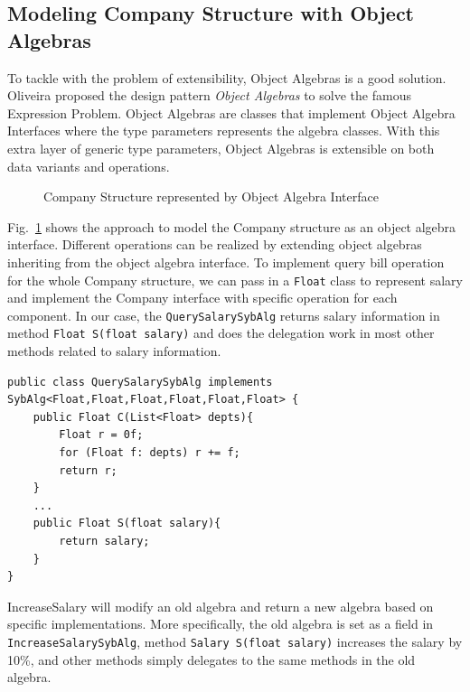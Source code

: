 


\subsection{Modeling Company Structure with Object Algebras}

To tackle with the problem of extensibility, Object Algebras is a good solution.  Oliveira proposed the design pattern \emph{Object Algebras}\cite{bruno12oa} to solve the famous Expression Problem. Object Algebras are classes that implement Object Algebra Interfaces where the type parameters represents the algebra classes. With this extra layer of generic type parameters, Object Algebras is extensible on both data variants and operations.  

\begin{figure}[tb]
\vspace{-.1in}
\caption{Company Structure represented by Object Algebra Interface}
\label{syb_tree}
\end{figure}

Fig.~\ref{syb_tree} shows the approach to model the Company
structure as an object algebra interface. Different operations can be realized by extending object algebras inheriting from the object algebra interface. To implement query bill
operation for the whole Company structure, we can pass in a \lstinline{Float} class to represent salary and implement the
Company interface with specific operation for each component. In our case, the \lstinline{QuerySalarySybAlg} returns salary information in method \lstinline{Float S(float salary)} and does the delegation work in most other methods related to salary information.

\begin{lstlisting}[numbers=none] 
public class QuerySalarySybAlg implements SybAlg<Float,Float,Float,Float,Float,Float> {
	public Float C(List<Float> depts){
		Float r = 0f;
		for (Float f: depts) r += f;
		return r;
	}
	...
	public Float S(float salary){
		return salary;
	}
}
\end{lstlisting}

IncreaseSalary will modify an old algebra and return a new algebra based on specific implementations. More specifically, the old algebra is set as a field in \lstinline{IncreaseSalarySybAlg}, method  \lstinline{Salary S(float salary)} increases the salary by 10\%, and other methods simply delegates to the same methods in the old algebra. 

